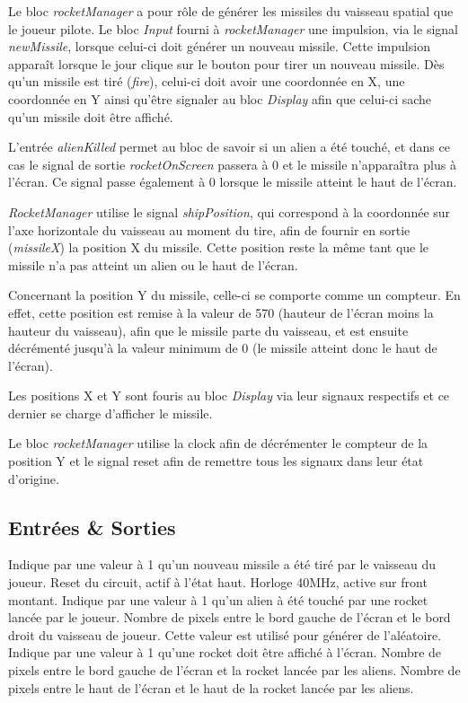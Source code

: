 \documentclass[french]{nakrule}
\begin{document}
Le bloc \emph{rocketManager} a pour rôle de générer les missiles du vaisseau
spatial que le joueur pilote. Le bloc \emph{Input} fourni à \emph{rocketManager}
une impulsion, via le signal \emph{newMissile}, lorsque celui-ci doit générer un
nouveau missile. Cette impulsion apparaît lorsque le jour clique sur le bouton
pour tirer un nouveau missile. Dès qu'un missile est tiré (\emph{fire}), celui-ci doit avoir
une coordonnée en X, une coordonnée en Y ainsi qu'être signaler au bloc
\emph{Display} afin que celui-ci sache qu'un missile doit être affiché.

L'entrée \emph{alienKilled} permet au bloc de savoir si un alien a été touché,
et dans ce cas le signal de sortie \emph{rocketOnScreen} passera à 0 et le
missile n'apparaîtra plus à l'écran. Ce signal passe
également à 0 lorsque le missile atteint le haut de l'écran.

\emph{RocketManager} utilise le signal \emph{shipPosition}, qui correspond à la
coordonnée sur l'axe horizontale du vaisseau au moment du tire, afin de fournir
en sortie (\emph{missileX}) la position X du missile. Cette position reste la
même tant que le missile n'a pas atteint un alien ou le haut de l'écran.

Concernant la position Y du missile, celle-ci se comporte comme un compteur. En
effet, cette position est remise à la valeur de 570 (hauteur de l'écran moins la
hauteur du vaisseau), afin que le missile parte du vaisseau, et est ensuite
décrémenté jusqu'à la valeur minimum de 0 (le missile atteint donc le haut de
l'écran).

Les positions X et Y sont fouris au bloc \emph{Display} via leur signaux
respectifs et ce dernier se charge d'afficher le missile.

Le bloc \emph{rocketManager} utilise la clock afin de décrémenter le compteur de
la position Y et le signal reset afin de remettre tous les signaux dans leur
état d'origine.

\subsection{Entrées \& Sorties}
\label{subsec:Entrees_Sorties_rocketManager}

\begin{descr}
   Indique par une valeur à 1 qu'un nouveau missile a été
  tiré par le vaisseau du joueur.
   Reset du circuit, actif à l'état haut.
   Horloge 40MHz, active sur front montant.
   Indique par une valeur à 1 qu'un alien à été touché
  par une rocket lancée par le joueur.
   Nombre de pixels entre le bord gauche de l'écran et
  le bord droit du vaisseau de joueur. Cette valeur est utilisé pour générer de l'aléatoire.
   Indique par une valeur à 1 qu'une rocket doit être
  affiché à l'écran.
   Nombre de pixels entre le bord gauche de l'écran et la rocket
  lancée par les aliens.
   Nombre de pixels entre le haut de l'écran et le haut de la rocket
  lancée par les aliens.
\end{descr}
\end{document}
